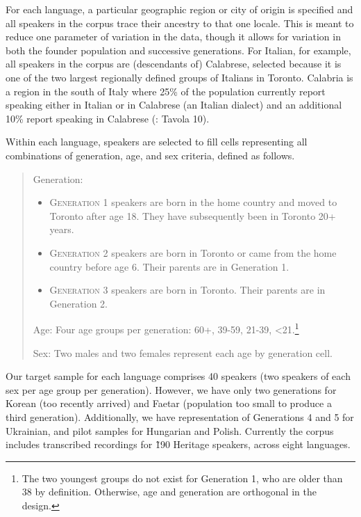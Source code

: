 \documentclass[output=paper]{LSP/langsci}
\begin{document}
For each language, a particular geographic region or city of origin is specified and all speakers in the corpus trace their ancestry to that one locale. This is meant to reduce one parameter of variation in the data, though it allows for variation in both the founder population and successive generations. For Italian, for example, all speakers in the corpus are (descendants of) Calabrese, selected because it is one of the two largest regionally defined groups of Italians in Toronto. Calabria is a region in the south of Italy where 25\% of the population currently report speaking either in Italian or in Calabrese (an Italian dialect) and an additional 10\% report speaking in Calabrese (\citealt{istat_istituto_nazionale_di_statistica_lingua_2007}: Tavola 10). 

Within each language, speakers are selected to fill cells representing all combinations of generation, age, and sex criteria, defined as follows. 

\begin{quote}
Generation:

\begin{itemize}
\item \textsc{Generation 1} speakers are born in the home country and moved to Toronto after age 18. They have subsequently been in Toronto 20+ years.

\item \textsc{Generation 2} speakers are born in Toronto or came from the home country before age 6. Their parents are in Generation 1.

\item \textsc{Generation 3} speakers are born in Toronto. Their parents are in Generation 2.
\end{itemize}

Age: Four age groups per generation: 60+, 39-59, 21-39, {\textless}21.\footnote{The two youngest groups do not exist for Generation 1, who are older than 38 by definition. Otherwise, age and generation are orthogonal in the design.} 

Sex: Two males and two females represent each age by generation cell.
\end{quote}

Our target sample for each language comprises 40 speakers (two speakers of each sex per age group per generation). However, we have only two generations for Korean (too recently arrived) and Faetar (population too small to produce a third generation). Additionally, we have representation of Generations 4 and 5 for Ukrainian, and pilot samples for Hungarian and Polish. Currently the corpus includes transcribed recordings for \~190 Heritage speakers, across eight languages.
\end{document}
